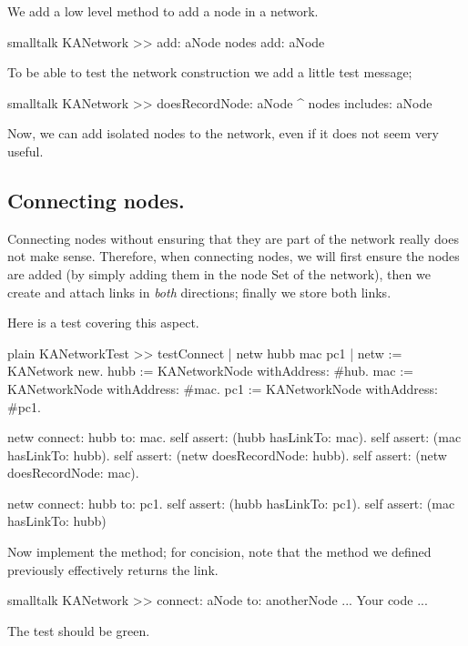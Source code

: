 \documentclass[10pt,twoside,english]{_support/latex/sbabook/sbabook}
\begin{document}
We add a low level method  to add a node in a network. 

\begin{displaycode}{smalltalk}
KANetwork >> add: aNode
	nodes add: aNode
\end{displaycode}

To be able to test the network construction we add a little test message;

\begin{displaycode}{smalltalk}
KANetwork >> doesRecordNode: aNode
	^ nodes includes: aNode
\end{displaycode}

Now, we can add isolated nodes to the network, even if it does not seem very useful.
\subsection{Connecting nodes.}
Connecting nodes without ensuring that they are part of the network really does not make sense.
Therefore, when connecting nodes, we will first ensure the nodes are added (by simply adding them in the node Set of the network), then we create and attach links in \textit{both} directions; finally we store both links.

Here is a test covering this aspect.

\begin{displaycode}{plain}
KANetworkTest >> testConnect
	| netw hubb mac pc1 |
	netw := KANetwork new.
	hubb := KANetworkNode withAddress: #hub.
	mac := KANetworkNode withAddress: #mac.
	pc1 := KANetworkNode withAddress: #pc1.

	netw connect: hubb to: mac.
	self assert: (hubb hasLinkTo: mac).
	self assert: (mac hasLinkTo: hubb).
	self assert: (netw doesRecordNode: hubb).
	self assert: (netw doesRecordNode: mac).

	netw connect: hubb to: pc1.
	self assert: (hubb hasLinkTo: pc1).
	self assert: (mac hasLinkTo: hubb)
\end{displaycode}

Now implement the  method; for concision, note that the  method we defined previously effectively returns the link.

\begin{displaycode}{smalltalk}
KANetwork >> connect: aNode to: anotherNode
    ... Your code ...
\end{displaycode}

The test  should be green.
\end{document}
